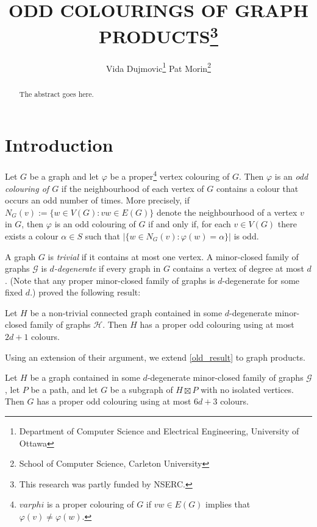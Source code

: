 \documentclass{patmorin}
\title{\MakeUppercase{Odd Colourings of Graph Products}\thanks{This research was partly funded by NSERC.}}
\author{%
  Vida Dujmovic\thanks{Department of Computer Science and Electrical Engineering, University of Ottawa}\qquad
  Pat Morin\thanks{School of Computer Science, Carleton University}
}
\date{}
\begin{document}
\maketitle

\begin{abstract}
  The abstract goes here.
\end{abstract}

%

\section{Introduction}

Let $G$ be a graph and let $\varphi$ be a proper\footnote{$varphi$ is a proper colouring of $G$ if $vw\in E(G)$ implies that $\varphi(v)\neq\varphi(w)$.} vertex colouring of $G$.  Then $\varphi$ is an \emph{odd colouring of $G$} if the neighbourhood of each vertex of $G$ contains a colour that occurs an odd number of times.  More precisely, if $N_G(v):=\{w\in V(G):vw\in E(G)\}$ denote the neighbourhood of a vertex $v$ in $G$, then $\varphi$ is an odd colouring of $G$ if and only if, for each $v\in V(G)$ there exists a colour $\alpha\in S$ such that $|\{w\in N_G(v): \varphi(w)=\alpha\}|$ is odd.  

A graph $G$ is \emph{trivial} if it contains at most one vertex.  A minor-closed family of graphs $\mathcal{G}$ is \emph{$d$-degenerate} if every graph in $G$ contains a vertex of degree at most $d$.  (Note that any proper minor-closed family of graphs is $d$-degenerate for some fixed $d$.)  \citet{cranston.lafferty.ea:note} proved the following result:

\begin{thm}\label{old_result}
  Let $H$ be a non-trivial connected graph contained in some $d$-degenerate minor-closed family of graphs $\mathcal{H}$.  Then $H$ has a proper odd colouring using at most $2d+1$ colours.
\end{thm}

Using an extension of their argument, we extend \cref{old_result} to graph products.

\begin{thm}\label{new_result}
  Let $H$ be a graph contained in some $d$-degenerate minor-closed family of graphs $\mathcal{G}$, let $P$ be a path, and let $G$ be a subgraph of $H\boxtimes P$ with no isolated vertices. Then $G$ has a proper odd colouring using at most $6d+3$ colours.
\end{thm}
\end{document}

